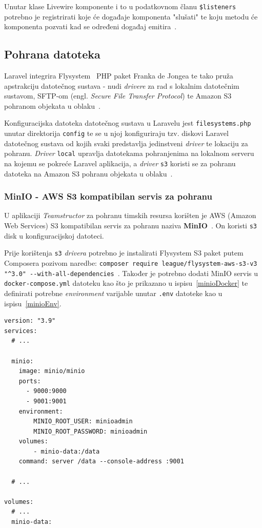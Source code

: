 Unutar klase Livewire komponente i to u podatkovnom članu \texttt{\$listeners} potrebno je registrirati koje će događaje komponenta "slušati" te koju metodu će komponenta pozvati kad se određeni događaj emitira~\cite{livewireEvents}. 

\subsection{Pohrana datoteka}
Laravel integrira Flysystem~\cite{flysystemGitHub} PHP paket Franka de Jongea te tako pruža apstrakciju datotečnog sustava - nudi \textit{drivere} za rad s lokalnim datotečnim sustavom, SFTP-om (engl. \textit{Secure File Transfer Protocol}) te Amazon S3 pohranom objekata u oblaku~\cite{fileStorage}.

Konfiguracijska datoteka datotečnog sustava u Laravelu jest \texttt{filesystems.php} unutar direktorija \texttt{config} te se u njoj konfiguriraju tzv. diskovi Laravel datotečnog sustava od kojih svaki predstavlja jedinstveni \textit{driver} te lokaciju za pohranu. \textit{Driver} \texttt{local} upravlja datotekama pohranjenima na lokalnom serveru na kojemu se pokreće Laravel aplikacija, a \textit{driver} \texttt{s3} koristi se za pohranu datoteka na Amazon S3 pohranu objekata u oblaku~\cite{fileStorage}. 

\subsubsection{MinIO - AWS S3 kompatibilan servis za pohranu}
U aplikaciji \textit{Teamstructor} za pohranu timskih resursa korišten je AWS (Amazon Web Services) S3 kompatibilan servis za pohranu naziva \textbf{MinIO}~\cite{minio}. On koristi \texttt{s3} disk u konfiguracijskoj datoteci.

Prije korištenja \texttt{s3} \textit{drivera} potrebno je instalirati Flysystem S3 paket putem Composera pozivom naredbe: \texttt{composer require league/flysystem-aws-s3-v3 "\textasciicircum 3.0" -{}-with-all-dependencies}~\cite{fileStorage}. Također je potrebno dodati MinIO servis u \texttt{docker-compose.yml} datoteku kao što je prikazano u ispisu~\ref{minioDocker} te definirati potrebne \textit{environment} varijable unutar \texttt{.env} datoteke kao u ispisu~\ref{minioEnv}.

\begin{lstlisting}[caption={\texttt{minio} servis unutar \texttt{docker-compose.yml} datoteke}, label=minioDocker]
version: "3.9"
services:
  # ...
  
  minio:
    image: minio/minio
    ports:
      - 9000:9000
      - 9001:9001
    environment:
        MINIO_ROOT_USER: minioadmin
        MINIO_ROOT_PASSWORD: minioadmin
    volumes:
        - minio-data:/data
    command: server /data --console-address :9001

  # ...
  
volumes:
  # ...
  minio-data:

\end{lstlisting}

